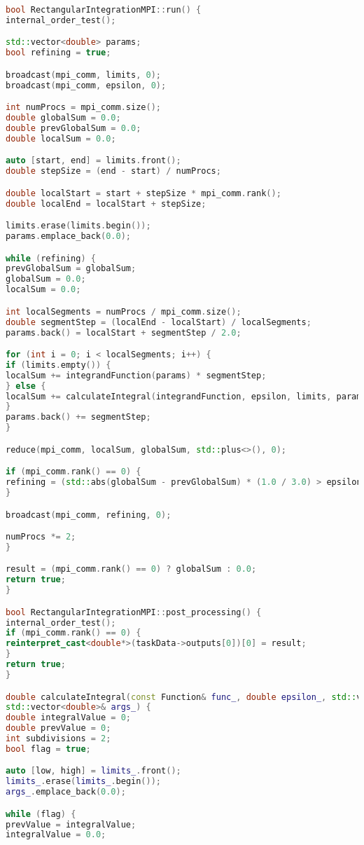 \documentclass[12pt]{article}
\begin{document}
\begin{lstlisting}[language=C++]
bool RectangularIntegrationMPI::run() {
internal_order_test();

std::vector<double> params;
bool refining = true;

broadcast(mpi_comm, limits, 0);
broadcast(mpi_comm, epsilon, 0);

int numProcs = mpi_comm.size();
double globalSum = 0.0;
double prevGlobalSum = 0.0;
double localSum = 0.0;

auto [start, end] = limits.front();
double stepSize = (end - start) / numProcs;

double localStart = start + stepSize * mpi_comm.rank();
double localEnd = localStart + stepSize;

limits.erase(limits.begin());
params.emplace_back(0.0);

while (refining) {
prevGlobalSum = globalSum;
globalSum = 0.0;
localSum = 0.0;

int localSegments = numProcs / mpi_comm.size();
double segmentStep = (localEnd - localStart) / localSegments;
params.back() = localStart + segmentStep / 2.0;

for (int i = 0; i < localSegments; i++) {
if (limits.empty()) {
localSum += integrandFunction(params) * segmentStep;
} else {
localSum += calculateIntegral(integrandFunction, epsilon, limits, params) * segmentStep;
}
params.back() += segmentStep;
}

reduce(mpi_comm, localSum, globalSum, std::plus<>(), 0);

if (mpi_comm.rank() == 0) {
refining = (std::abs(globalSum - prevGlobalSum) * (1.0 / 3.0) > epsilon);
}

broadcast(mpi_comm, refining, 0);

numProcs *= 2;
}

result = (mpi_comm.rank() == 0) ? globalSum : 0.0;
return true;
}

bool RectangularIntegrationMPI::post_processing() {
internal_order_test();
if (mpi_comm.rank() == 0) {
reinterpret_cast<double*>(taskData->outputs[0])[0] = result;
}
return true;
}

double calculateIntegral(const Function& func_, double epsilon_, std::vector<std::pair<double, double>>& limits_,
std::vector<double>& args_) {
double integralValue = 0;
double prevValue = 0;
int subdivisions = 2;
bool flag = true;

auto [low, high] = limits_.front();
limits_.erase(limits_.begin());
args_.emplace_back(0.0);

while (flag) {
prevValue = integralValue;
integralValue = 0.0;


\end{lstlisting}
\end{document}
